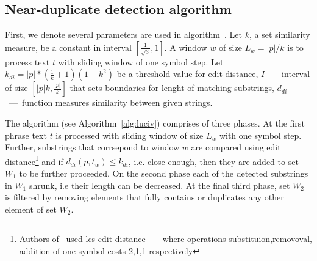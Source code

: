 
\subsection{Near-duplicate detection algorithm}
First, we denote several parameters are used in algorithm~\cite{.}.
Let $k$, a set similarity measure, be a constant in interval $[\frac{1}{\sqrt{3}},1]$.
A window $w$ of size $L_{w} = |p|/k$ is to process text $t$ with sliding window of one symbol step.
Let $k_{di} = |p|*(\frac{1}{k}+1)(1-k^2)$ be a threshold value for edit distance,
$I$~---~interval of size $[|p|k,\frac{|p|}{k}]$ that sets boundaries for lenght of matching substrings,
$d_{di}$~---~function measures similarity between given strings.

The algorithm (see Algorithm~\ref{alg:luciv}) comprises of three phases.
At the first phrase text $t$ is processed with sliding window of size $L_{w}$ with one symbol step.
Further, substrings that corrsepond to window $w$ are compared using edit distance\footnote{
  Authors of~\cite{.} used lcs edit distance~---~where  operations substituion,removoval, addition of one symbol costs 2,1,1 respectively}
and if $d_{di}(p,t_{w}) \leq k_{di}$, i.e. close enough, then they are added to set $W_{1}$ to be further proceeded. 
On the second phase each of the detected substrings in $W_{1}$ shrunk, i.e their length can be decreased.
At the final third phase, set $W_{2}$ is filtered by removing elements that fully contains or duplicates any other element of set $W_{2}$.

